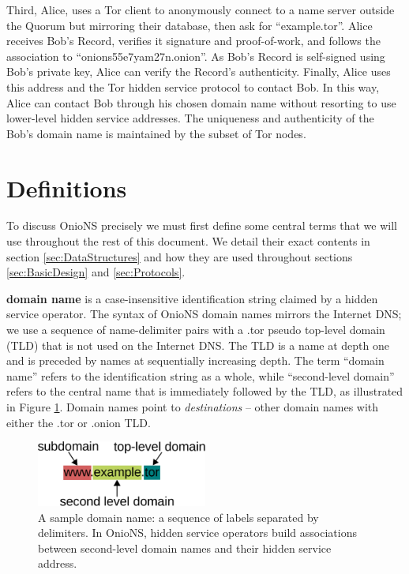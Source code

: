 Third, Alice, uses a Tor client to anonymously connect to a name server outside the Quorum but mirroring their database, then ask for ``example.tor''. Alice receives Bob's Record, verifies it signature and proof-of-work, and follows the association to ``onions55e7yam27n.onion''. As Bob's Record is self-signed using Bob's private key, Alice can verify the Record's authenticity. Finally, Alice uses this address and the Tor hidden service protocol to contact Bob. In this way, Alice can contact Bob through his chosen domain name without resorting to use lower-level hidden service addresses. The uniqueness and authenticity of the Bob's domain name is maintained by the subset of Tor nodes.

\section{Definitions}

To discuss OnioNS precisely we must first define some central terms that we will use throughout the rest of this document. We detail their exact contents in section \ref{sec:DataStructures} and how they are used throughout sections \ref{sec:BasicDesign} and \ref{sec:Protocols}.

\textbf{domain name} is a case-insensitive identification string claimed by a hidden service operator. The syntax of OnioNS domain names mirrors the Internet DNS; we use a sequence of name-delimiter pairs with a .tor pseudo top-level domain (TLD) that is not used on the Internet DNS. The TLD is a name at depth one and is preceded by names at sequentially increasing depth. The term ``domain name'' refers to the identification string as a whole, while ``second-level domain'' refers to the central name that is immediately followed by the TLD, as illustrated in Figure \ref{fig:sampleDomain}. Domain names point to \emph{destinations} -- other domain names with either the .tor or .onion TLD.

		\begin{figure}[htbp]
			\centering
			\includegraphics[width=0.5\textwidth]{images/domain-name.eps}
			\caption{A sample domain name: a sequence of labels separated by delimiters. In OnioNS, hidden service operators build associations between second-level domain names and their hidden service address.}
			\label{fig:sampleDomain}
		\end{figure}

